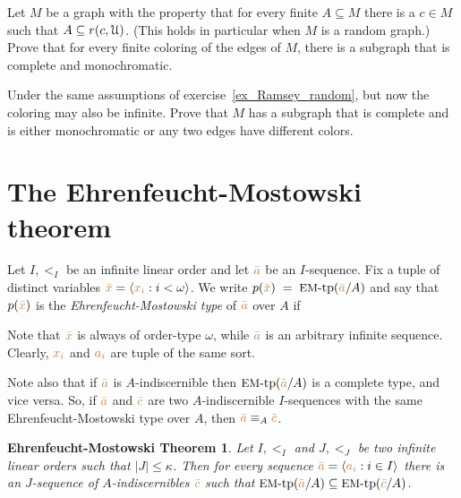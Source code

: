 \documentclass[creche.tex]{subfiles}
\begin{document}
\begin{exercise}\label{ex_Ramsey_random}
    Let $M$ be a graph with the property that for every finite $A\subseteq M$ there is a $c\in M$ such that $A\subseteq r(c,\EuScript U)$. 
    (This holds in particular when $M$ is a random graph.)
    Prove that for every finite coloring of the edges of $M$, there is a subgraph that is complete and monochromatic.\QED
\end{exercise}


\begin{exercise}
    Under the same assumptions of exercise~\ref{ex_Ramsey_random}, but now the coloring may also be infinite.
    Prove that $M$ has a subgraph that is complete and is either monochromatic or any two edges have different colors.\QED
\end{exercise}

\section{The Ehrenfeucht-Mostowski theorem}\label{EM}

Let $I,<_I$ be an infinite linear order and let ${\color{brown}\bar a}$ be an $I$-sequence.
Fix a tuple of distinct variables ${\color{brown}\bar x}=\langle{\color{brown}x_i}: i<\omega\rangle$.
We write \emph{$p({\color{brown}\bar x})\;=\;\textrm{{\small EM}-tp}({\color{brown}\bar a}/A)$} and say that $p({\color{brown}\bar x})$ is the \emph{Ehren\-feucht-Mostowski type\/} of ${\color{brown}\bar a}$ over $A$ if


Note that ${\color{brown}\bar x}$ is always of order-type $\omega$,
while ${\color{brown}\bar a}$ is an arbitrary infinite sequence.
Clearly,
${\color{brown} x_i}$ and  ${\color{brown} a_i}$ are tuple of the same sort.

Note also that if ${\color{brown}\bar a}$ is $A$-indiscernible then $\textrm{{\small EM}\mbox{-}tp}({\color{brown}\bar a}/A)$ is a complete type,
and vice versa.
So,
if ${\color{brown}\bar a}$ and ${\color{brown}\bar c}$ are two $A$-indiscernible $I$-sequences with the same Ehren\-feucht-Mostowski type over $A$,
then ${\color{brown}\bar a}\equiv_A {\color{brown}\bar c}$.

\theoremstyle{mio}
\newtheorem{EhrenfeuchtMostowski}[thm]{Ehrenfeucht-Mostowski Theorem}
\begin{EhrenfeuchtMostowski}\label{thm_EM}
Let $I,<_I$ and $J,<_J$ be two infinite linear orders such that $|J|\le \kappa$.
Then for every sequence ${\color{brown}\bar a}=\langle{\color{brown}a_i}:i\in I\rangle$ there is an $J$-sequence of $A$-indiscernibles ${\color{brown}\bar c}$ such that $\textrm{{\small EM}\mbox{-}tp}({\color{brown}\bar a}/A)\subseteq\textrm{{\small EM}\mbox{-}tp}({\color{brown}\bar c}/A)$.
\end{EhrenfeuchtMostowski}
\end{document}
